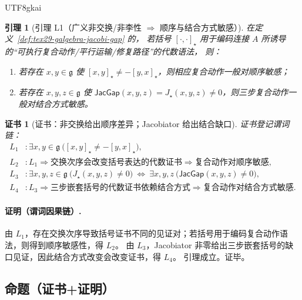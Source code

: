 \documentclass[12pt]{article}
\newtheorem{lemma}{引理}[section]
\newtheorem{Certificate}{证书}[section]
\newcommand{\KouJing}{\texorpdfstring{表述约定}{表述约定}}
\begin{document}
\begin{CJK*}{UTF8}{gkai}
\begin{lemma}[引理 L1（广义非交换/非李性 $\Rightarrow$ 顺序与结合方式敏感）]
\label{lem:tex29-noncomm-jacgap-path-order}
在定义~\ref{def:tex29-galgebra-jacobi-gap} 的，
若括号 $[\cdot,\cdot]_{\star}$ 用于编码连接 $A$ 所诱导的“可执行复合动作/平行运输/修复路径”的代数语法，
则：
\begin{enumerate}
  \item 若存在 $x,y\in\mathfrak{g}$ 使 $[x,y]_{\star}\neq -[y,x]_{\star}$，则相应复合动作一般对顺序敏感；
  \item 若存在 $x,y,z\in\mathfrak{g}$ 使 $\mathsf{JacGap}(x,y,z)=J_{\star}(x,y,z)\neq 0$，则三步复合动作一般对结合方式敏感。
\end{enumerate}
\end{lemma}

\begin{Certificate}[证书：非交换给出顺序差异；Jacobiator 给出结合缺口]
\label{cert:tex29-noncomm-jacgap-path-order}
证书登记谓词链：
\[
\begin{aligned}
  L_1 &: \exists x,y\in\mathfrak{g}\ \bigl([x,y]_{\star}\neq -[y,x]_{\star}\bigr),\\
  L_2 &: L_1\Rightarrow \text{交换次序会改变括号表达的代数证书}\Rightarrow \text{复合动作对顺序敏感},\\
  L_3 &: \exists x,y,z\in\mathfrak{g}\ \bigl(J_{\star}(x,y,z)\neq 0\bigr)\ \Leftrightarrow\ \exists x,y,z\
    \bigl(\mathsf{JacGap}(x,y,z)\neq 0\bigr),\\
  L_4 &: L_3\Rightarrow \text{三步嵌套括号的代数证书依赖结合方式}\Rightarrow \text{复合动作对结合方式敏感}.
\end{aligned}
\]
\end{Certificate}

\paragraph{证明（谓词因果链）.}
由 $L_1$，存在交换次序导致括号证书不同的见证对；若括号用于编码复合动作语法，则得到顺序敏感性，得 $L_2$。
由 $L_3$，Jacobiator 非零给出三步嵌套括号的缺口见证，因此结合方式改变会改变证书，得 $L_4$。
引理成立。证毕。

\subsection{命题（证书+证明）}
\label{subsec:tex29-principal-bundle-atiyah-monad-prop}


\end{CJK*}
\end{document}
